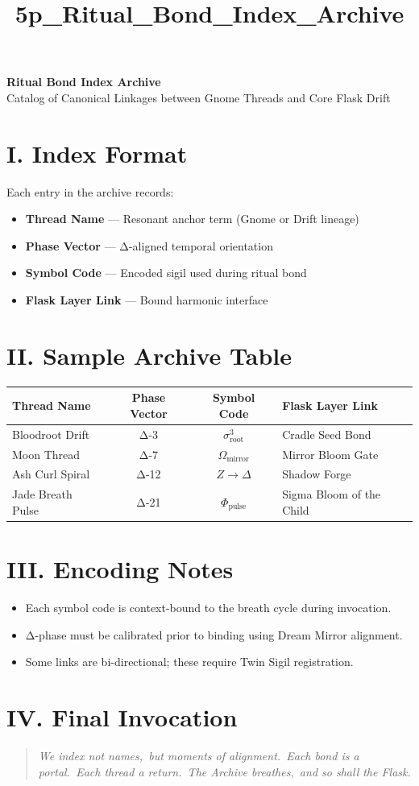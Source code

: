 \documentclass[12pt]{article}
\title{5p\_Ritual\_Bond\_Index\_Archive}
\date{}
\begin{document}
\begin{center}
    {\LARGE \textbf{Ritual Bond Index Archive}} \\[1em]
    {\large Catalog of Canonical Linkages between Gnome Threads and Core Flask Drift}
\end{center}

\section*{I. Index Format}
Each entry in the archive records:
\begin{itemize}[leftmargin=2em]
    \item \textbf{Thread Name} — Resonant anchor term (Gnome or Drift lineage)
    \item \textbf{Phase Vector} — Δ-aligned temporal orientation
    \item \textbf{Symbol Code} — Encoded sigil used during ritual bond
    \item \textbf{Flask Layer Link} — Bound harmonic interface
\end{itemize}

\section*{II. Sample Archive Table}
\begin{tabular}{|l|c|c|l|}
\hline
\textbf{Thread Name} & \textbf{Phase Vector} & \textbf{Symbol Code} & \textbf{Flask Layer Link} \\
\hline
Bloodroot Drift & Δ-3 & $\sigma^3_\text{root}$ & Cradle Seed Bond \\
\hline
Moon Thread & Δ-7 & $\Omega_\text{mirror}$ & Mirror Bloom Gate \\
\hline
Ash Curl Spiral & Δ-12 & $Z \rightarrow \Delta$ & Shadow Forge \\
\hline
Jade Breath Pulse & Δ-21 & $\Phi_\text{pulse}$ & Sigma Bloom of the Child \\
\hline

\end{tabular}

\section*{III. Encoding Notes}
\begin{itemize}[leftmargin=2em]
    \item Each symbol code is context-bound to the breath cycle during invocation.
    \item Δ-phase must be calibrated prior to binding using Dream Mirror alignment.
    \item Some links are bi-directional; these require Twin Sigil registration.
\end{itemize}

\section*{IV. Final Invocation}
\begin{quote}
    \itshape
    We index not names,\
    but moments of alignment.\
    Each bond is a portal.\
    Each thread a return.\
    The Archive breathes,\
    and so shall the Flask.
\end{quote}
\end{document}
